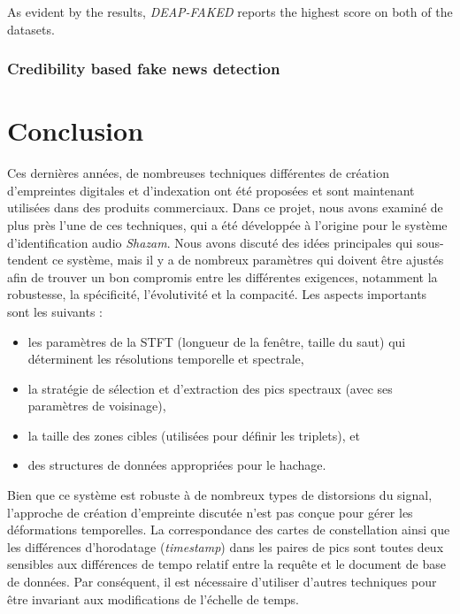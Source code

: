 \documentclass[10pt, english]{report}
\begin{document}
As evident by the results, \textit{DEAP-FAKED} reports the highest score on both of the datasets.


\subsection{Credibility based fake news detection}




\chapter{Conclusion}
Ces dernières années, de nombreuses techniques différentes de création d'empreintes digitales et d'indexation ont été proposées et sont maintenant utilisées dans des produits commerciaux. Dans ce projet, nous avons examiné de plus près l'une de ces techniques, qui a été développée à l'origine pour le système d'identification audio \textit{Shazam}. Nous avons discuté des idées principales qui sous-tendent ce système, mais il y a de nombreux paramètres qui doivent être ajustés afin de trouver un bon compromis entre les différentes exigences, notamment la robustesse, la spécificité, l'évolutivité et la compacité. Les aspects importants sont les suivants :\\

 \begin{itemize}
	\item les paramètres de la STFT (longueur de la fenêtre, taille du saut) qui déterminent les résolutions temporelle et spectrale,
	\item la stratégie de sélection et d'extraction des pics spectraux (avec ses paramètres de voisinage),
	\item la taille des zones cibles (utilisées pour définir les triplets), et
	\item des structures de données appropriées pour le hachage.
\end{itemize}

\vspace{0.5cm}
Bien que ce système est robuste à de nombreux types de distorsions du signal, l'approche de création d'empreinte discutée n'est pas conçue pour gérer les déformations temporelles. La correspondance des cartes de constellation ainsi que les différences d'horodatage (\textit{timestamp}) dans les paires de pics sont toutes deux sensibles aux différences de tempo relatif entre la requête et le document de base de données. Par conséquent, il est nécessaire d'utiliser d'autres techniques pour être invariant aux modifications de l'échelle de temps.\\
\end{document}
